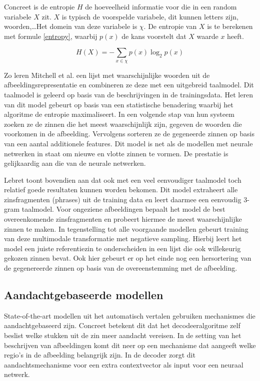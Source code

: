 Concreet is de entropie $H$ de hoeveelheid informatie voor die in een random variabele $X$ zit. $X$ is typisch de voorspelde variabele, dit kunnen letters zijn, woorden,\ldots Het domein van deze variabele is $\chi$. De entropie van $X$ is te berekenen met formule \eqref{entropy}, waarbij $p(x)$ de kans voorstelt dat $X$ waarde $x$ heeft\cite{Jurafsky:2009:SLP:1214993}.

\begin{equation}
     H(X) = -\sum_{x \in \chi}p(x)\log_2p(x)
     \label{entropy}
 \end{equation} 

Zo leren Mitchell et al.\cite{Mitchell2015} een lijst met waarschijnlijke woorden uit de afbeeldingsrepresentatie en combineren ze deze met een uitgebreid taalmodel. Dit taalmodel is geleerd op basis van de beschrijvingen in de trainingsdata. Het leren van dit model gebeurt op basis van een statistische benadering waarbij het algoritme de entropie maximaliseert. In een volgende stap van hun systeem zoeken ze de zinnen die het meest waarschijnlijk zijn, gegeven de woorden die voorkomen in de afbeelding. Vervolgens sorteren ze de gegeneerde zinnen op basis van een aantal additionele features. Dit model is net als de modellen met neurale netwerken in staat om nieuwe en vlotte zinnen te vormen. De prestatie is gelijkaardig aan die van de neurale netwerken.

Lebret\cite{Lebret2015} toont bovendien aan dat ook met een veel eenvoudiger taalmodel toch relatief goede resultaten kunnen worden bekomen. Dit model extraheert alle zinsfragmenten (phrases) uit de training data en leert daarmee een eenvoudig 3-gram taalmodel. Voor ongeziene afbeeldingen bepaalt het model de best overeenkomende zinsfragmenten en probeert hiermee de meest waarschijnlijke zinnen te maken. In tegenstelling tot alle voorgaande modellen gebeurt training van deze multimodale transformatie met negatieve sampling. Hierbij leert het model een juiste referentiezin te onderscheiden in een lijst die ook willekeurig gekozen zinnen bevat. Ook hier gebeurt er op het einde nog een hersortering van de gegenereerde zinnen op basis van de overeenstemming met de afbeelding.

\subsection{Aandachtgebaseerde modellen}
State-of-the-art modellen uit het automatisch vertalen gebruiken mechanismes die aandachtgebaseerd zijn. Concreet betekent dit dat het decodeeralgoritme zelf beslist welke stukken uit de zin meer aandacht vereisen.
In de setting van het beschrijven van afbeeldingen komt dit neer op een mechanisme dat aangeeft welke regio's in de afbeelding belangrijk zijn. In de decoder zorgt dit aandachtsmechanisme voor een extra contextvector als input voor een neuraal netwerk. 

